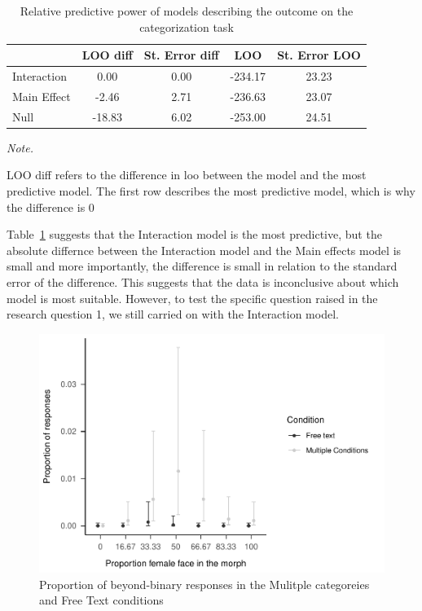 \documentclass[
  man]{apa7}
\begin{document}
\begin{table}

\caption{\label{tab:loo}Relative predictive power of models describing the outcome on the categorization task}
\centering
\begin{threeparttable}
\begin{tabular}[t]{lcccc}
\toprule
  & LOO diff & St. Error diff & LOO & St. Error LOO\\
\midrule
Interaction & 0.00 & 0.00 & -234.17 & 23.23\\
Main Effect & -2.46 & 2.71 & -236.63 & 23.07\\
Null & -18.83 & 6.02 & -253.00 & 24.51\\
\bottomrule
\end{tabular}
\begin{tablenotes}[para]
\item \textit{Note.} 
\item LOO diff refers to the difference in loo between the model and the most predictive model. The first row describes the most predictive model, which is why the difference is 0
\end{tablenotes}
\end{threeparttable}
\end{table}

Table~\ref{tab:loo} suggests that the Interaction model is the most predictive, but the absolute differnce between the Interaction model and the Main effects model is small and more importantly, the difference is small in relation to the standard error of the difference. This suggests that the data is inconclusive about which model is most suitable. However, to test the specific question raised in the research question 1, we still carried on with the Interaction model.

\begin{figure}
\centering
\includegraphics{resp_opts_manus23022_files/figure-latex/exp-one-inf-1.pdf}
\caption{\label{fig:exp-one-inf}Proportion of beyond-binary responses in the Mulitple categoreies and Free Text conditions}
\end{figure}
\end{document}
